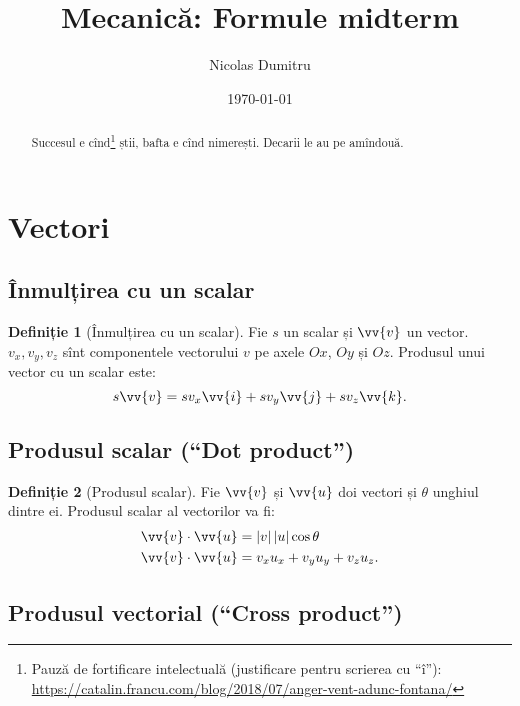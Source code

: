 \documentclass[a4paper]{article}
\title{Mecanică: Formule midterm}
\author{Nicolas Dumitru}
\date{\today}
\theoremstyle{definition}
\newtheorem{definition}{Definiție}[section]
\theoremstyle{plain}%
\theoremstyle{remark}
\begin{document}
\maketitle

\begin{abstract}
	Succesul e cînd\footnote{Pauză de fortificare intelectuală (justificare pentru scrierea cu ``î''): \url{https://catalin.francu.com/blog/2018/07/anger-vent-adunc-fontana/}} știi, bafta e cînd nimerești. Decarii le au pe amîndouă.
\end{abstract}

\section{Vectori}

\subsection{Înmulțirea cu un scalar}

\begin{definition}[Înmulțirea cu un scalar]
	Fie \(s\) un scalar și \(\vv{v}\) un vector. \(v_x, v_y, v_z\) sînt componentele vectorului \(v\) pe axele \(Ox\), \(Oy\) și \(Oz\). Produsul unui vector cu un scalar este:
	\begin{equation*}
		s \vv{v} = s v_x \vv{i} + s v_y \vv{j} + s v_z \vv{k} \text{.}
	\end{equation*}
\end{definition}

\subsection{Produsul scalar (``Dot product'')}

\begin{definition}[Produsul scalar]
	Fie \(\vv{v}\) și \(\vv{u}\) doi vectori și \(\theta\) unghiul dintre ei. Produsul scalar al vectorilor va fi:
	\begin{align*}
		\vv{v} \cdot \vv{u} & = \left|v\right| \left|u\right| \cos \theta \\
		\vv{v} \cdot \vv{u} & = v_x u_x + v_y u_y + v_z u_z \text{.}
	\end{align*}
\end{definition}

\subsection{Produsul vectorial (``Cross product'')}
\end{document}
